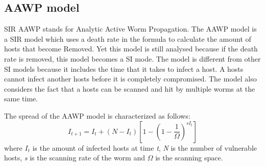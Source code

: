 \subsection{AAWP model}
SIR AAWP stands for Analytic Active Worm Propagation. The AAWP model is a SIR model which uses a death rate in the formula to calculate the amount of hosts that become Removed. Yet this model is still analysed because if the death rate is removed, this model becomes a SI mode. The model is different from other SI models because it includes the time that it takes to infect a host. A hosts cannot infect another hosts before it is completely compromised. The model also considers the fact that a hosts can be scanned and hit by multiple worms at the same time. %

The spread of the AAWP model is characterized as follows:
\begin{equation}
I_{t+1}=I_{t}+(N-I_{t})[1-(1-\dfrac{1}{\Omega})^{sI_{t}}]
\end{equation}
where $I_{t}$ is the amount of infected hosts at time \textit{t}, \textit{N} is the number of vulnerable hosts, \textit{s} is
the scanning rate of the worm and $\Omega$ is the scanning
space.







